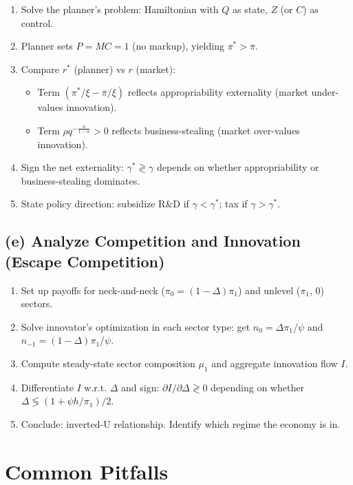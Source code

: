 \documentclass[a4paper,11pt]{article}
\newcommand{\pibar}{\overline{\pi}}
\begin{document}
\begin{enumerate}
    \item Solve the planner's problem: Hamiltonian with $Q$ as state, $Z$ (or $C$) as control.
    \item Planner sets $P = MC = 1$ (no markup), yielding $\pi^* > \pibar$.
    \item Compare $r^*$ (planner) vs $r$ (market):
    \begin{itemize}
        \item Term $(\pi^*/\xi - \pibar/\xi)$ reflects appropriability externality (market under-values innovation).
        \item Term $\rho q^{-\frac{\alpha}{1-\alpha}} > 0$ reflects business-stealing (market over-values innovation).
    \end{itemize}
    \item Sign the net externality: $\gamma^* \gtrless \gamma$ depends on whether appropriability or business-stealing dominates.
    \item State policy direction: subsidize R\&D if $\gamma < \gamma^*$; tax if $\gamma > \gamma^*$.
\end{enumerate}

\subsection*{(e) Analyze Competition and Innovation (Escape Competition)}

\begin{enumerate}
    \item Set up payoffs for neck-and-neck ($\pi_0 = (1-\Delta)\pi_1$) and unlevel ($\pi_1$, $0$) sectors.
    \item Solve innovator's optimization in each sector type: get $n_0 = \Delta\pi_1/\psi$ and $n_{-1} = (1-\Delta)\pi_1/\psi$.
    \item Compute steady-state sector composition $\mu_1$ and aggregate innovation flow $I$.
    \item Differentiate $I$ w.r.t. $\Delta$ and sign: $\partial I/\partial\Delta \gtrless 0$ depending on whether $\Delta \lessgtr (1 + \psi h/\pi_1)/2$.
    \item Conclude: inverted-U relationship. Identify which regime the economy is in.
\end{enumerate}

\clearpage

\section{Common Pitfalls}
\end{document}
